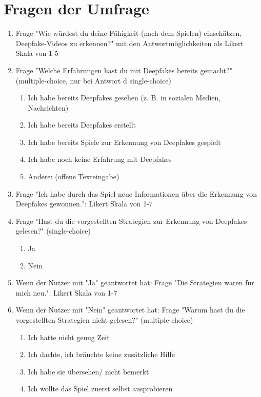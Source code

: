 \section{Fragen der Umfrage}
\label{sec:survey_questions}
\begin{enumerate}
    \item Frage "Wie würdest du deine Fähigkeit (nach dem Spielen) einschätzen, Deepfake-Videos zu erkennen?" mit den Antwortmöglichkeiten als Likert Skala von 1-5
    \item Frage "Welche Erfahrungen hast du mit Deepfakes bereits gemacht?" (multiple-choice, nur bei Antwort d single-choice)
    \begin{enumerate} [label=\alph*)]
        \item Ich habe bereits Deepfakes gesehen (z. B. in sozialen Medien, Nachrichten)
        \item Ich habe bereits Deepfakes erstellt
        \item Ich habe bereits Spiele zur Erkennung von Deepfakes gespielt
        \item Ich habe noch keine Erfahrung mit Deepfakes
        \item Andere: (offene Texteingabe)
    \end{enumerate}
    \item Frage "Ich habe durch das Spiel neue Informationen über die Erkennung von Deepfakes gewonnen.": Likert Skala von 1-7
    \item Frage "Hast du die vorgestellten Strategien zur Erkennung von Deepfakes gelesen?" (single-choice)
    \begin{enumerate} [label=\alph*)]
        \item Ja 
        \item Nein 
    \end{enumerate}
    \item Wenn der Nutzer mit "Ja" geantwortet hat: 
        Frage "Die Strategien waren für mich neu.": Likert Skala von 1-7
    \item Wenn der Nutzer mit "Nein" geantwortet hat:
	    Frage "Warum hast du die vorgestellten Strategien nicht gelesen?" (multiple-choice)
    \begin{enumerate} [label=\alph*)]
        \item Ich hatte nicht genug Zeit
        \item Ich dachte, ich bräuchte keine zusätzliche Hilfe 
        \item Ich habe sie übersehen/ nicht bemerkt 
        \item Ich wollte das Spiel zuerst selbst ausprobieren 

\end{enumerate}
\end{enumerate}
